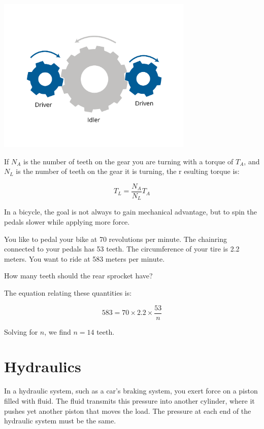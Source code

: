 \includegraphics[width=0.7\textwidth]{gearsNew.png}

If \( N_A \) is the number of teeth on the gear you are turning with a torque of 
\( T_A \), and \( N_L \) is the number of teeth on the gear it is turning, the r
esulting torque is:

\[
T_L = \frac{N_A}{N_L} T_A
\]
\begin{Exercise}[title={Gears}, label=gear]
In a bicycle, the goal is not always to gain mechanical advantage, but to spin 
the pedals slower while applying more force.

You like to pedal your bike at 70 revolutions per minute. The chainring 
connected to your pedals has 53 teeth. The circumference of your tire is 2.2 
meters. You want to ride at 583 meters per minute.

How many teeth should the rear sprocket have?
\end{Exercise}
\begin{Answer}[ref=gear]
The equation relating these quantities is:

\[
583 = 70 \times 2.2 \times \frac{53}{n}
\]

Solving for \( n \), we find \( n = 14 \) teeth.
\end{Answer}

\section{Hydraulics}

In a hydraulic system, such as a car's braking system, you exert force on a 
piston filled with fluid. The fluid transmits this pressure into another 
cylinder, where it pushes yet another piston that moves the load. The pressure 
at each end of the hydraulic system must be the same. 

